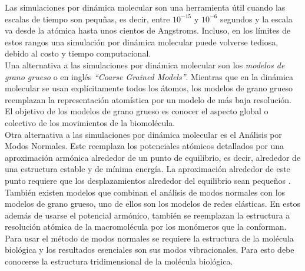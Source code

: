 Las simulaciones por din\'{a}mica molecular son una herramienta \'{u}til cuando las escalas de tiempo son pequ\~{n}as, es decir, entre $10^{-15}$ y  $10^{-6}$ segundos y la escala va desde la at\'{o}mica hasta unos cientos de Angstroms. Incluso, en los l\'{i}mites de estos rangos una simulaci\'{o}n por din\'{a}mica molecular puede volverse tediosa, debido al costo y tiempo computacional.\\

Una alternativa a las simulaciones por din\'{a}mica molecular son los \textit{modelos de grano grueso} o en ingl\'{e}s \textit{``Coarse Grained Models''}.  Mientras que en la din\'{a}mica molecular se usan expl\'{i}citamente todos los \'{a}tomos, los modelos de grano grueso reemplazan la representaci\'{o}n atom\'{i}stica por un modelo de m\'{a}s baja resoluci\'{o}n. El objetivo de los modelos de grano grueso es conocer el aspecto global o colectivo de los movimientos de la biomol\'{e}cula. \\

Otra alternativa a las simulaciones por din\'{a}mica molecular es el An\'{a}lisis por Modos Normales. Este reemplaza los potenciales at\'{o}micos detallados por una aproximaci\'{o}n arm\'{o}nica alrededor de un punto de equilibrio, es decir, alrededor de una estructura estable y de m\'{i}nima energ\'{i}a. La aproximaci\'{o}n alrededor de este punto requiere que los desplazamientos alrededor del equilibrio sean peque\~{n}os \cite{Lezon2009}.\\

Tambi\'{e}n existen modelos que combinan el an\'{a}lisis de modos normales con los modelos de grano grueso, uno de ellos son los modelos de redes el\'{a}sticas. En estos adem\'{a}s de usarse el potencial arm\'{o}nico, tambi\'{e}n se reemplazan la estructura a resoluci\'{o}n at\'{o}mica de la macromol\'{e}cula por los mon\'{o}meros que la conforman.\\

Para usar el m\'{e}todo de modos normales se requiere la estructura de la mol\'{e}cula biol\'{o}gica y los resultados esenciales son sus modos vibracionales. Para esto debe conocerse la estructura tridimensional de la mol\'{e}cula biol\'{o}gica.\\

